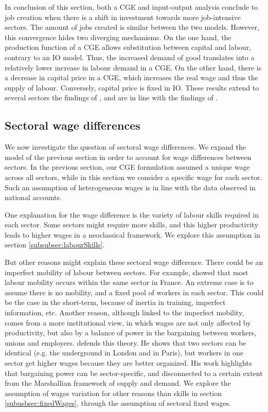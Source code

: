 In conclusion of this section, both a CGE and input-output analysis conclude to job creation when there is a shift in investment towards more job-intensive sectors. The amount of jobs created is similar between the two models. 
However, this convergence hides two diverging mechanisms. 
On the one hand, the production function of a CGE allows substitution between capital and labour, contrary to an IO model. Thus, the increased demand of good translates into a relatively lower increase in labour demand in a CGE. 
On the other hand, there is a decrease in capital price in a CGE, which increases the real wage and thus the supply of labour. Conversely, capital price is fixed in IO.
These results extend to several sectors the findings of \citet{Bovenberg1994, Bovenberg1996}, and are in line with the findings of \citet{Quirion2007}.


\subsection{Sectoral wage differences} \label{subsec:wageDifference}
We now investigate the question of sectoral wage differences.
We expand the model of the previous section in order to account for wage differences between sectors. In the previous section, our CGE formulation assumed a unique wage across all sectors, while in this section we consider a specific wage for each sector. Such an assumption of heterogeneous wages is in line with the data observed in national accounts. 

One explanation for the wage difference is the variety of labour skills required in each sector. Some sectors might require more skills, and this higher productivity leads to higher wages in a neoclassical framework. We explore this assumption in section \ref{subsubsec:labourSkills}.

But other reasons might explain these sectoral wage difference. There could be an imperfect mobility of labour between sectors. For example, \citet{Duhautois2005} showed that most labour mobility occurs within the same sector in France. An extreme case is to assume there is no mobility, and a fixed pool of workers in each sector. This could be the case in the short-term, because of inertia in training, imperfect information, etc.
Another reason, although linked to the imperfect mobility, comes from a more institutional view, in which wages are not only affected by productivity, but also by a balance of power in the bargaining between workers, unions and employers. \citet{Askenazy2016} defends this theory. He shows that two sectors can be identical (e.g. the underground in London and in Paris), but workers in one sector get higher wages because they are better organized. His work highlights that bargaining power can be sector-specific, and disconnected to a certain extent from the Marshallian framework of supply and demand.
We explore the assumption of wages variation for other reasons than skills in section \ref{subusbsec:fixedWages}, through the assumption of sectoral fixed wages.


